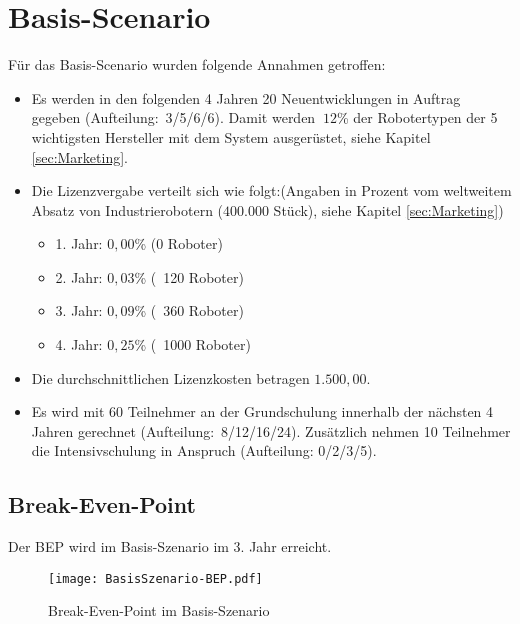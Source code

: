 \section{Basis-Scenario}
Für das Basis-Scenario wurden folgende Annahmen getroffen:
\begin{itemize}
	\item Es werden in den folgenden 4 Jahren 20 Neuentwicklungen in Auftrag gegeben (Aufteilung:~3/5/6/6). Damit werden $~12$\% der Robotertypen der 5 wichtigsten Hersteller mit dem System ausgerüstet, siehe Kapitel \ref{sec:Marketing}.
	\item Die Lizenzvergabe verteilt sich wie folgt:\newline (Angaben in Prozent vom weltweitem Absatz von Industrierobotern ($400.000$ Stück), siehe Kapitel \ref{sec:Marketing})
	\begin{itemize}
		\item 1. Jahr: $0,00$\% (0 Roboter)
		\item 2. Jahr: $0,03$\% (~120 Roboter)
		\item 3. Jahr: $0,09$\% (~360 Roboter)
		\item 4. Jahr: $0,25$\% (~1000 Roboter)
	\end{itemize}
	\item Die durchschnittlichen Lizenzkosten betragen $1.500,00$\officialeuro.
	\item Es wird mit 60 Teilnehmer an der Grundschulung innerhalb der nächsten 4 Jahren gerechnet (Aufteilung:~8/12/16/24). Zusätzlich nehmen 10 Teilnehmer die Intensivschulung in Anspruch (Aufteilung: 0/2/3/5).
\end{itemize}

\subsection{Break-Even-Point}
Der BEP wird im Basis-Szenario im 3. Jahr erreicht.
\begin{figure}[h]
	\centering
	\texttt{[image: BasisSzenario-BEP.pdf]}
	\caption{Break-Even-Point im Basis-Szenario}
	\label{fig:BasisSzenario-BEP}
\end{figure}

